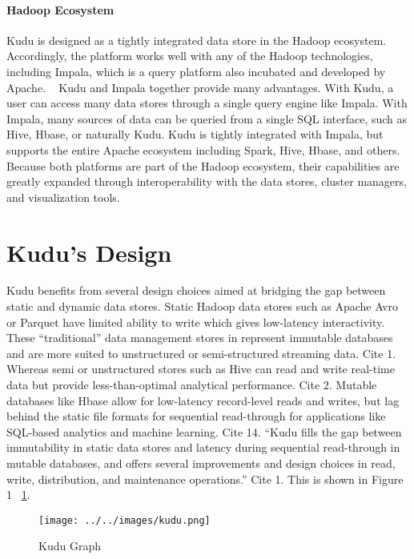 \paragraph{Hadoop Ecosystem}
Kudu is designed as a tightly integrated data store in the Hadoop ecosystem.
Accordingly, the platform works well with any of the Hadoop technologies, including
Impala, which is a query platform also incubated and developed by Apache.
~\cite{hid-sp18-407-impala-intro} Kudu and Impala together provide many advantages.  With Kudu, a user can access many data stores through a single query engine like
Impala. With Impala, many sources of data can be queried from a
single SQL interface, such as Hive, Hbase, or naturally Kudu. Kudu is
tightly integrated with Impala, but supports the entire Apache
ecosystem including Spark, Hive, Hbase, and others. ~\cite{hid-sp18-407-benchmarking-kudu}
Because both platforms are part of the Hadoop ecosystem, their capabilities
are greatly expanded through interoperability with the data stores,
cluster managers, and visualization tools. 

\section{Kudu's Design}
Kudu benefits from several design choices aimed at bridging the gap
between static and dynamic data stores. Static Hadoop data stores
such as Apache Avro or Parquet have limited ability to write which gives
low-latency interactivity. These ``traditional'' data management
stores in represent immutable databases and are more suited to
unstructured or semi-structured streaming data. Cite 1. Whereas semi
or unstructured stores such as Hive can read and write real-time data
but provide less-than-optimal analytical performance. Cite 2. Mutable
databases like Hbase allow for low-latency record-level reads and
writes, but lag behind the static file formats for sequential
read-through for applications like SQL-based analytics and machine
learning.  Cite 14. ``Kudu fills the gap between immutability in static
data stores and latency during sequential read-through in mutable databases, and offers several improvements and design choices in read, write, distribution, and maintenance operations.''  Cite 1. This is shown in Figure 1 ~\ref{f:kudu}. 

\begin{figure}[!ht]
  \centering\texttt{[image: ../../images/kudu.png]}
  \caption{Kudu Graph}\label{f:kudu}
\end{figure}

